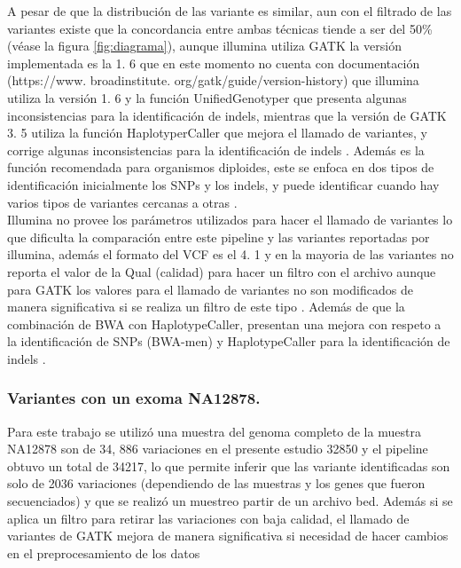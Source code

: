 A pesar de que la distribución de las variante es similar, aun con el filtrado de las variantes existe que la concordancia entre ambas técnicas tiende a ser del 50\% (véase la figura \ref{fig:diagrama}), aunque illumina utiliza GATK la versión implementada es la 1. 6 que en este momento no cuenta con documentación (https://www. broadinstitute. org/gatk/guide/version-history) que illumina utiliza la versión 1. 6 y la función UnifiedGenotyper que presenta algunas inconsistencias para la identificación de indels, mientras que la versión de GATK 3. 5 utiliza la función HaplotyperCaller que mejora el llamado de variantes, y corrige algunas inconsistencias para la identificación de indels \cite{ORawe2013}. Además es la función recomendada para organismos diploides, este se enfoca en dos tipos de identificación inicialmente los SNPs y los indels, y puede identificar cuando hay varios tipos de variantes cercanas a otras \cite{Auwera2014}. \\

Illumina no provee los parámetros utilizados para hacer el llamado de variantes lo que dificulta la comparación entre este pipeline y las variantes reportadas por illumina, además el formato del VCF es el 4. 1 y en la mayoria de las variantes no reporta el valor de la Qual (calidad) para hacer un filtro con el archivo aunque para GATK los valores para el llamado de variantes no son modificados de manera significativa si se realiza un filtro de este tipo \cite{Hwang2015}. Además de que la combinación de BWA con HaplotypeCaller, presentan una mejora con respeto a la identificación de SNPs (BWA-men) y HaplotypeCaller para la identificación de indels \cite{Cornish2015}. 

\subsubsection*{Variantes con un exoma NA12878.}

Para este trabajo se utilizó una muestra del genoma completo de la muestra NA12878 son de 34, 886 variaciones \cite{Cornish2015} en el presente estudio 32850 y el pipeline obtuvo un total de 34217, lo que permite inferir que las variante identificadas son solo de 2036 variaciones (dependiendo de las muestras y los genes que fueron secuenciados) y que se realizó un muestreo partir de un archivo bed. Además si se aplica un filtro para retirar las variaciones con baja calidad, el llamado de variantes de GATK mejora de manera significativa si necesidad de hacer cambios en el preprocesamiento de los datos \cite{Warden2014} \\

